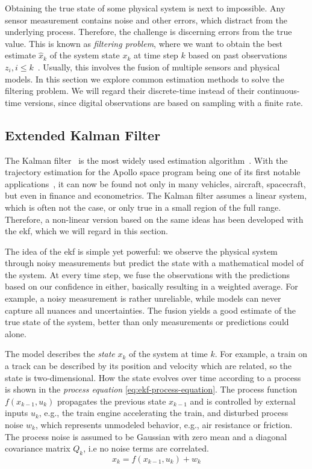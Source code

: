 Obtaining the true state of some physical system is next to impossible. Any sensor measurement contains noise and other errors, which distract from the underlying process. Therefore, the challenge is discerning errors from the true value. This is known as \textit{filtering problem}, where we want to obtain the best estimate $\hat{x}_k$ of the system state $x_k$ at time step $k$ based on past observations $z_i, i \leq k$~\cite[p.~67]{Mitter.1996}. Usually, this involves the fusion of multiple sensors and physical models. In this section we explore common estimation methods to solve the filtering problem. We will regard their discrete-time instead of their continuous-time versions, since digital observations are based on sampling with a finite rate.

\subsection{Extended Kalman Filter}\label{sec:background-ekf}
The Kalman filter~\cite{Kalman.1960} is the most widely used estimation algorithm~\cite[p.~401]{Julier.2004}. With the trajectory estimation for the Apollo space program being one of its first notable applications~\cite{Grewal.2010}, it can now be found not only in many vehicles, aircraft, spacecraft, but even in finance and econometrics. The Kalman filter assumes a linear system, which is often not the case, or only true in a small region of the full range. Therefore, a non-linear version based on the same ideas has been developed with the \gls{ekf}, which we will regard in this section.

The idea of the \gls{ekf} is simple yet powerful: we observe the physical system through noisy measurements but predict the state with a mathematical model of the system. At every time step, we fuse the observations with the predictions based on our confidence in either, basically resulting in a weighted average. For example, a noisy measurement is rather unreliable, while models can never capture all nuances and uncertainties. The fusion yields a good estimate of the true state of the system, better than only measurements or predictions could alone.

The model describes the \textit{state} $x_k$ of the system at time $k$. For example, a train on a track can be described by its position and velocity which are related, so the state is two-dimensional. How the state evolves over time according to a process is shown in the \textit{process equation} \ref{eq:ekf-process-equation}. The process function $f(x_{k-1}, u_k)$ propagates the previous state $x_{k-1}$ and is controlled by external inputs $u_k$, e.g., the train engine accelerating the train, and disturbed process noise $w_k$, which represents unmodeled behavior, e.g., air resistance or friction. The process noise is assumed to be Gaussian with zero mean and a diagonal covariance matrix $Q_k$, i.e no noise terms are correlated.
\begin{equation}\label{eq:ekf-process-equation}%
x_k = f(x_{k-1}, u_k) + w_k%
\end{equation}

